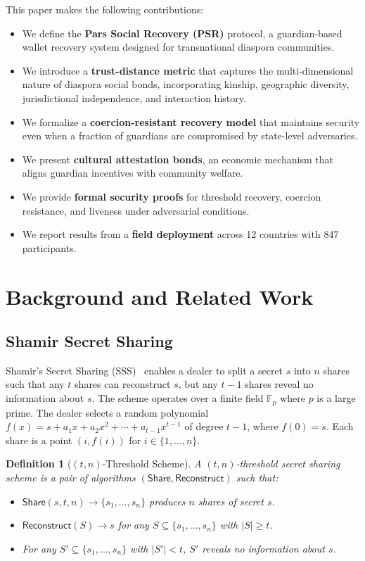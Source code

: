 \documentclass[11pt,a4paper,twocolumn]{article}
\newtheorem{definition}[theorem]{Definition}
\begin{document}
This paper makes the following contributions:

\begin{itemize}
  \item We define the \textbf{Pars Social Recovery (PSR)} protocol, a guardian-based wallet recovery system designed for transnational diaspora communities.
  \item We introduce a \textbf{trust-distance metric} that captures the multi-dimensional nature of diaspora social bonds, incorporating kinship, geographic diversity, jurisdictional independence, and interaction history.
  \item We formalize a \textbf{coercion-resistant recovery model} that maintains security even when a fraction of guardians are compromised by state-level adversaries.
  \item We present \textbf{cultural attestation bonds}, an economic mechanism that aligns guardian incentives with community welfare.
  \item We provide \textbf{formal security proofs} for threshold recovery, coercion resistance, and liveness under adversarial conditions.
  \item We report results from a \textbf{field deployment} across 12 countries with 847 participants.
\end{itemize}

\section{Background and Related Work}\label{sec:background}

\subsection{Shamir Secret Sharing}

Shamir's Secret Sharing (SSS)~\cite{shamir1979share} enables a dealer to split a secret $s$ into $n$ shares such that any $t$ shares can reconstruct $s$, but any $t-1$ shares reveal no information about $s$. The scheme operates over a finite field $\mathbb{F}_p$ where $p$ is a large prime. The dealer selects a random polynomial $f(x) = s + a_1 x + a_2 x^2 + \cdots + a_{t-1} x^{t-1}$ of degree $t-1$, where $f(0) = s$. Each share is a point $(i, f(i))$ for $i \in \{1, \ldots, n\}$.

\begin{definition}[$(t,n)$-Threshold Scheme]
A $(t,n)$-threshold secret sharing scheme is a pair of algorithms $(\mathsf{Share}, \mathsf{Reconstruct})$ such that:
\begin{itemize}
  \item $\mathsf{Share}(s, t, n) \to \{s_1, \ldots, s_n\}$ produces $n$ shares of secret $s$.
  \item $\mathsf{Reconstruct}(S) \to s$ for any $S \subseteq \{s_1, \ldots, s_n\}$ with $|S| \geq t$.
  \item For any $S' \subseteq \{s_1, \ldots, s_n\}$ with $|S'| < t$, $S'$ reveals no information about $s$.
\end{itemize}
\end{definition}
\end{document}
